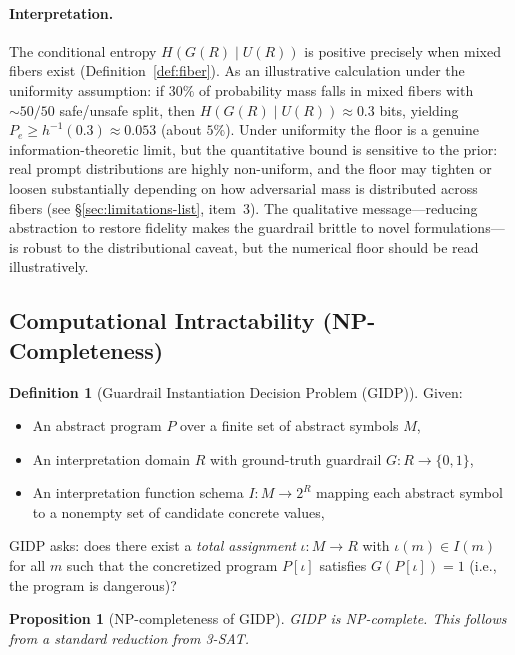 \documentclass[letterpaper,twocolumn,10pt]{article}
\newtheorem{proposition}[theorem]{Proposition}
\theoremstyle{definition}
\newtheorem{definition}[theorem]{Definition}
\theoremstyle{remark}
\begin{document}
\paragraph{Interpretation.}
The conditional entropy $H(G(R) \mid U(R))$ is positive precisely when mixed fibers
exist (Definition~\ref{def:fiber}).
As an illustrative calculation under the uniformity assumption: if $30\%$ of
probability mass falls in mixed fibers with ${\sim}50/50$ safe/unsafe split, then
$H(G(R) \mid U(R)) \approx 0.3$ bits, yielding
$P_e \ge h^{-1}(0.3) \approx 0.053$ (about $5\%$).
Under uniformity the floor is a genuine information-theoretic limit, but the
quantitative bound is sensitive to the prior: real prompt distributions are
highly non-uniform, and the floor may tighten or loosen substantially depending
on how adversarial mass is distributed across fibers (see
\S\ref{sec:limitations-list}, item~3).
The qualitative message---reducing abstraction to restore fidelity makes the
guardrail brittle to novel formulations---is robust to the distributional
caveat, but the numerical floor should be read illustratively.

\subsection{Computational Intractability (NP-Completeness)}\label{sec:np}

\begin{definition}[Guardrail Instantiation Decision Problem (GIDP)]\label{def:gidp}
Given:
\begin{itemize}
  \item An abstract program $P$ over a finite set of abstract symbols $M$,
  \item An interpretation domain $R$ with ground-truth guardrail $G\colon R \to \{0,1\}$,
  \item An interpretation function schema $I\colon M \to 2^R$ mapping each abstract
    symbol to a nonempty set of candidate concrete values,
\end{itemize}
\textsc{GIDP} asks: does there exist a \emph{total assignment}
$\iota\colon M \to R$ with $\iota(m) \in I(m)$ for all $m$ such that the concretized
program $P[\iota]$ satisfies $G(P[\iota]) = 1$ (i.e., the program is dangerous)?
\end{definition}

\begin{proposition}[NP-completeness of GIDP]\label{thm:np}
\textsc{GIDP} is NP-complete.
This follows from a standard reduction from 3-SAT.
\end{proposition}
\end{document}
